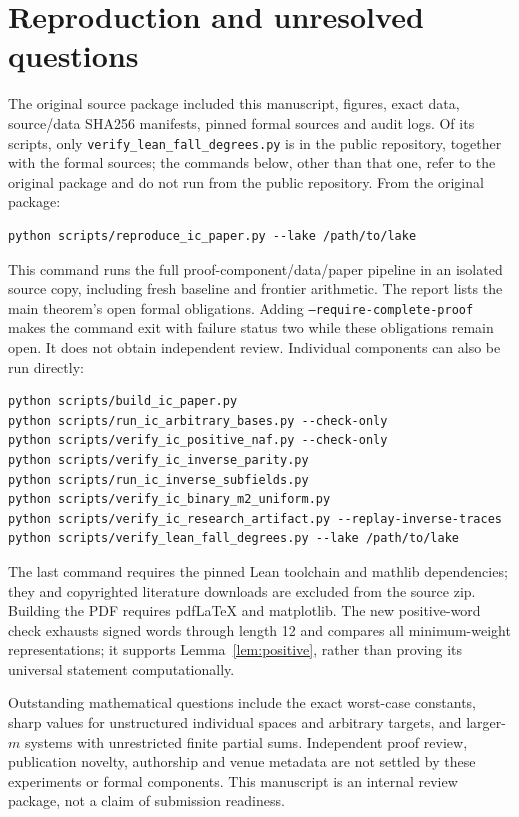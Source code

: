 \documentclass[11pt]{article}
\theoremstyle{remark}\newtheorem{remark}[theorem]{Remark}
\begin{document}
\section{Reproduction and unresolved questions}
The original source package included this manuscript, figures, exact data, source/data SHA256 manifests, pinned formal sources and audit logs. Of its scripts, only \texttt{verify\_\allowbreak lean\_\allowbreak fall\_\allowbreak degrees.py} is in the public repository, together with the formal sources; the commands below, other than that one, refer to the original package and do not run from the public repository. From the original package:
\begin{verbatim}
python scripts/reproduce_ic_paper.py --lake /path/to/lake
\end{verbatim}
This command runs the full proof-component/data/paper pipeline in an isolated
source copy, including fresh baseline and frontier arithmetic. The report
lists the main theorem's open formal obligations. Adding
\texttt{--require-complete-proof} makes the command exit with failure status
two while these obligations remain open. It does not obtain independent review.
Individual components can also be run directly:
\begin{verbatim}
python scripts/build_ic_paper.py
python scripts/run_ic_arbitrary_bases.py --check-only
python scripts/verify_ic_positive_naf.py --check-only
python scripts/verify_ic_inverse_parity.py
python scripts/run_ic_inverse_subfields.py
python scripts/verify_ic_binary_m2_uniform.py
python scripts/verify_ic_research_artifact.py --replay-inverse-traces
python scripts/verify_lean_fall_degrees.py --lake /path/to/lake
\end{verbatim}
The last command requires the pinned Lean toolchain and mathlib dependencies;
they and copyrighted literature downloads are excluded from the source zip.
Building the PDF requires pdfLaTeX and matplotlib. The new positive-word
check exhausts signed words through length 12 and compares all minimum-weight
representations; it supports Lemma~\ref{lem:positive}, rather than proving
its universal statement computationally.

Outstanding mathematical questions include the exact worst-case constants,
sharp values for unstructured individual spaces and arbitrary targets,
and larger-$m$ systems with unrestricted finite partial sums. Independent
proof review, publication novelty, authorship and venue metadata are not
settled by these experiments or formal components. This manuscript is an
internal review package, not a claim of submission readiness.
\end{document}
